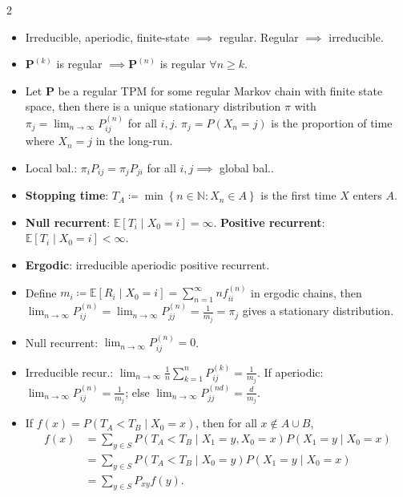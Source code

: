 \documentclass[8pt]{article}
\begin{document}
\begin{multicols*}{2}
\begin{itemize}
            \item Irreducible, aperiodic, finite-state $\implies$ regular. Regular $\implies$ irreducible.
            \item $\bm{P}^{\left(k\right)}$ is regular $\implies \bm{P}^{\left(n\right)}$ is regular $\forall n \geq k$.
            \item Let $\bm{P}$ be a regular TPM for some regular Markov chain with finite state space, then there is a unique stationary distribution $\pi$ with $\pi_j = \lim_{n \to \infty}P^{\left(n\right)}_{ij}$ for all $i, j$. $\pi_j = P\left(X_n = j\right)$ is the proportion of time where $X_n = j$ in the long-run.
            \item Local bal.: $\pi_iP_{ij} = \pi_jP_{ji}$ for all $i, j \implies$ global bal..
            \item \textbf{Stopping time}: $T_A \coloneqq \min\left\{n \in \mathbb{N} \colon X_n \in A\right\}$ is the first time $X$ enters $A$.
            \item \textbf{Null recurrent}: $\mathbb{E}\left[T_i \mid X_0 = i\right] = \infty$. \textbf{Positive recurrent}: $\mathbb{E}\left[T_i \mid X_0 = i\right] < \infty$.
            \item \textbf{Ergodic}: irreducible aperiodic positive recurrent.
            \item Define $m_i \coloneqq \mathbb{E}\left[R_i \mid X_0 = i\right] = \sum_{n = 1}^{\infty}nf^{(n)}_{ii}$ in ergodic chains, then $\lim_{n \to \infty}P_{ij}^{(n)} = \lim_{n \to \infty}P_{jj}^{(n)} = \frac{1}{m_j} = \pi_j$ gives a stationary distribution.
            \item Null recurrent: $\lim_{n \to \infty}P^{(n)}_{ij} = 0$.
            \item Irreducible recur.: $\lim_{n \to \infty}\frac{1}{n}\sum_{k = 1}^{n}P^{(k)}_{ij} = \frac{1}{m_j}$. If aperiodic: $\lim_{n \to \infty}P^{(n)}_{ij} = \frac{1}{m_j}$; else $\lim_{n \to \infty}P^{(nd)}_{jj} = \frac{d}{m_j}$.
            \item If $f\left(x\right) = P\left(T_A < T_B \mid X_0 = x\right)$, then for all $x \notin A \cup B$,
            \begin{align*}
                f\left(x\right) & = \sum_{y \in S}P\left(T_A < T_B \mid X_1 = y, X_0 = x\right)P\left(X_1 = y \mid X_0 = x\right) \\
                & = \sum_{y \in S}P\left(T_A < T_B \mid X_0 = y\right)P\left(X_1 = y \mid X_0 = x\right) \\
                & = \sum_{y \in S}P_{xy}f\left(y\right).

\end{align*}
\end{itemize}
\end{multicols*}
\end{document}
